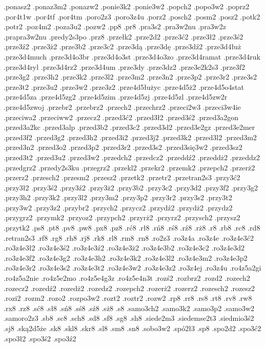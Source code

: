 {.ponasz2
.ponaz3m2
.ponazw2
.ponie3k2
.ponie3w2
.popch2
.popo3w2
.poprz2
.por4t1w
.por4tf
.por4tm
.poro2z3
.poro3z4u
.porz2
.posch2
.posm2
.posz2
.potk2
.potr2
.poz4m2
.poza3u2
.pozw2
.pp8
.pr8
.pra3s2
.pra3w2nu
.pra3w2z
.prapra3w2nu
.predy2s3po
.prz8
.przełk2
.prze2d2
.prze3ć2
.prze3ł2
.prze3ś2
.prze3ź2
.prze3ż2
.prze3b2
.prze3c2
.prze3dą
.prze3dę
.prze3dź2
.prze3d4łuż
.prze3d4much
.prze3d4o3br
.prze3d4o3st
.prze3d4o3zo
.prze3d4ramat
.prze3d4ruk
.prze3d4ryl
.prze3d4rz2
.prze3d4um
.prze3dy
.prze3dz2
.prze3e2k2s3
.prze3f2
.prze3g2
.prze3h2
.prze3k2
.prze3l2
.prze3m2
.prze3n2
.prze3p2
.prze3r2
.prze3s2
.prze3t2
.prze3u2
.prze3w2
.prze3z2
.prze4d5łużyc
.prze4d5ż2
.prze4d5o4stat
.prze4d5za
.prze4d5zg2
.prze4d5zim
.prze4d5zj
.prze4d5zl
.prze4d5zw2r
.prze4d5zwoj
.przebr2
.przebrz2
.przech2
.przechrz2
.przeci2w3
.przeci3w4ie
.przeciwa2
.przeciww2
.przecz2
.przed3ć2
.przed3ł2
.przed3ś2
.przed3a2gon
.przed3a2kc
.przed3alp
.przed3b2
.przed3c2
.przed3d2
.przed3e2gz
.przed3e2mer
.przed3f2
.przed3g2
.przed3h2
.przed3i2
.przed3j2
.przed3k2
.przed3l2
.przed3m2
.przed3n2
.przed3o2
.przed3p2
.przed3r2
.przed3s2
.przed3się3w2
.przed3sz2
.przed3t2
.przed3u2
.przed3w2
.przedch2
.przedcz2
.przeddź2
.przeddż2
.przeddz2
.przedgrz2
.przedy2s3ku
.przegrz2
.przekl2
.przekr2
.przemk2
.przepch2
.przerż2
.przerz2
.przesch2
.przesm2
.przesz2
.przetk2
.przetr2
.przetran2s3
.przy3ć2
.przy3ł2
.przy3ś2
.przy3ź2
.przy3ż2
.przy3b2
.przy3c2
.przy3d2
.przy3f2
.przy3g2
.przy3h2
.przy3k2
.przy3l2
.przy3m2
.przy3p2
.przy3r2
.przy3s2
.przy3t2
.przy3w2
.przy3z2
.przybr2
.przych2
.przycz2
.przydź2
.przydż2
.przydz2
.przygrz2
.przymk2
.przyoz2
.przypch2
.przyrż2
.przyrz2
.przysch2
.przysz2
.przytk2
.ps8
.pt8
.pv8
.pw8
.px8
.pz8
.rć8
.rł8
.rń8
.rś8
.rź8
.rż8
.r8
.rb8
.rc8
.rd8
.retran2s3
.rf8
.rg8
.rh8
.rj8
.rk8
.rl8
.rm8
.rn8
.ro2z3
.ro3z4a
.ro3z4e
.ro3z4e3ć2
.ro3z4e3ł2
.ro3z4e3ś2
.ro3z4e3ź2
.ro3z4e3ż2
.ro3z4e3b2
.ro3z4e3c2
.ro3z4e3d2
.ro3z4e3f2
.ro3z4e3g2
.ro3z4e3h2
.ro3z4e3k2
.ro3z4e3l2
.ro3z4e3m2
.ro3z4e3p2
.ro3z4e3r2
.ro3z4e3s2
.ro3z4e3t2
.ro3z4e3w2
.ro3z4e3z2
.ro3z4ej
.ro3z4u
.ro4z5a2gi
.ro4z5a2nie
.ro4z5e2mo
.ro4z5e4g3z
.ro4z5e4n3t
.rozś2
.rozbrz2
.rozd2
.rozech2
.rozecz2
.rozedź2
.rozedż2
.rozedz2
.rozepch2
.rozerż2
.rozerz2
.rozesch2
.rozesz2
.rozi2
.rozm2
.rozo2
.rozpo3w2
.rozt2
.roztr2
.rozw2
.rp8
.rr8
.rs8
.rt8
.rv8
.rw8
.rx8
.rz8
.sć8
.sł8
.sń8
.sś8
.sź8
.sż8
.s8
.samo3ch2
.samo3k2
.samo3p2
.samo3w2
.samoro2z3
.sb8
.sc8
.sch8
.sd8
.sf8
.sg8
.sh8
.siede2m3
.siedemse2t3
.siedmio3ś2
.sj8
.ską2d5że
.sk8
.skl8
.skr8
.sl8
.sm8
.sn8
.sobo3w2
.spó2ł3
.sp8
.spo2d2
.spo3ć2
.spo3ł2
.spo3ś2
.spo3ź2
}
